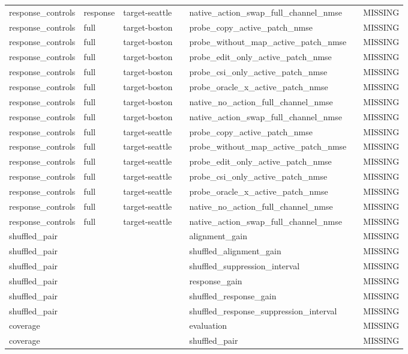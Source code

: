 \begin{longtable}{lllllll}
response\_controls & response & target-seattle &  & native\_action\_swap\_full\_channel\_nmse &  & MISSING \\
response\_controls & full & target-boston &  & probe\_copy\_active\_patch\_nmse &  & MISSING \\
response\_controls & full & target-boston &  & probe\_without\_map\_active\_patch\_nmse &  & MISSING \\
response\_controls & full & target-boston &  & probe\_edit\_only\_active\_patch\_nmse &  & MISSING \\
response\_controls & full & target-boston &  & probe\_csi\_only\_active\_patch\_nmse &  & MISSING \\
response\_controls & full & target-boston &  & probe\_oracle\_x\_active\_patch\_nmse &  & MISSING \\
response\_controls & full & target-boston &  & native\_no\_action\_full\_channel\_nmse &  & MISSING \\
response\_controls & full & target-boston &  & native\_action\_swap\_full\_channel\_nmse &  & MISSING \\
response\_controls & full & target-seattle &  & probe\_copy\_active\_patch\_nmse &  & MISSING \\
response\_controls & full & target-seattle &  & probe\_without\_map\_active\_patch\_nmse &  & MISSING \\
response\_controls & full & target-seattle &  & probe\_edit\_only\_active\_patch\_nmse &  & MISSING \\
response\_controls & full & target-seattle &  & probe\_csi\_only\_active\_patch\_nmse &  & MISSING \\
response\_controls & full & target-seattle &  & probe\_oracle\_x\_active\_patch\_nmse &  & MISSING \\
response\_controls & full & target-seattle &  & native\_no\_action\_full\_channel\_nmse &  & MISSING \\
response\_controls & full & target-seattle &  & native\_action\_swap\_full\_channel\_nmse &  & MISSING \\
shuffled\_pair &  &  &  & alignment\_gain &  & MISSING \\
shuffled\_pair &  &  &  & shuffled\_alignment\_gain &  & MISSING \\
shuffled\_pair &  &  &  & shuffled\_suppression\_interval &  & MISSING \\
shuffled\_pair &  &  &  & response\_gain &  & MISSING \\
shuffled\_pair &  &  &  & shuffled\_response\_gain &  & MISSING \\
shuffled\_pair &  &  &  & shuffled\_response\_suppression\_interval &  & MISSING \\
coverage &  &  &  & evaluation &  & MISSING \\
coverage &  &  &  & shuffled\_pair &  & MISSING \\
\bottomrule
\end{longtable}
